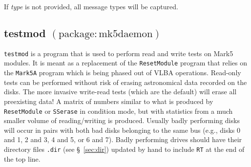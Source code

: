 If {\em type} is not provided, all message types will be captured.






\subsection{testmod {\small $\mathrm{(package: mk5daemon)}$}} \label{sec:testmod}

{\tt testmod} is a program that is used to perform read and write tests on Mark5 modules.  
It is meant as a replacement of the {\tt ResetModule} program that relies on the {\tt Mark5A} program which is being phased out of VLBA operations.
Read-only tests can be performed without risk of erasing astronomical data recorded on the disks.
The more invasive write-read tests (which are the default) will erase all preexisting data!
A matrix of numbers similar to what is produced by {\tt ResetModule} or {\tt SSerase} in condition mode, but with statistics from a much smaller volume of reading/writing is produced.
Usually badly performing disks will occur in pairs with both bad disks belonging to the same bus (e.g., disks 0 and 1, 2 and 3, 4 and 5, or 6 and 7).  
Badly performing drives should have their directory files {\tt .dir} (see \S~\ref{sec:dir}) updated by hand to include {\tt RT} at the end of the top line.

